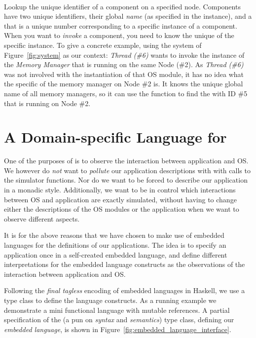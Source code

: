 \paragraph{}
Lookup the unique identifier of a component on a specified node.
Components have two unique identifiers, their global \emph{name} (as specified in the  instance), and a  that is a unique number corresponding to a specific instance of a component.
When you want to \emph{invoke} a component, you need to know the unique  of the specific instance.
To give a concrete example, using the system of Figure~\ref{fig:system} as our context: \emph{Thread (\#6)} wants to invoke the instance of the \emph{Memory Manager} that is running on the same Node (\#2).
As \emph{Thread (\#6)} was not involved with the instantiation of that OS module, it has no idea what the specific  of the memory manager on Node \#2 is.
It knows the unique global name of all memory managers, so it can use the  function to find the  with ID \#5 that is running on Node \#2.

\section{A Domain-specific Language for \soosim}
\label{sec:dsl}
One of the purposes of \soosim is to observe the interaction between application and OS.
We however do \emph{not} want to \emph{pollute} our application descriptions with with calls to the simulator functions.
Nor do we want to be forced to describe our application in a monadic style.
Additionally, we want to be in control which interactions between OS and application are exactly simulated, without having to change either the descriptions of the OS modules or the application when we want to observe different aspects.

It is for the above reasons that we have chosen to make use of embedded languages for the definitions of our applications.
The idea is to specify an application once in a self-created embedded language, and define different interpretations for the embedded language constructs as the observations of the interaction between application and OS.

Following the \emph{final tagless} \cite{final_tagless_embedding} encoding of embedded languages in Haskell, we use a type class to define the language constructs.
As a running example we demonstrate a mini functional language with mutable references.
A partial specification of the  (a pun on \emph{syntax} and \emph{semantics}) type class, defining our \emph{embedded language}, is shown in Figure~\ref{fig:embedded_language_interface}.


